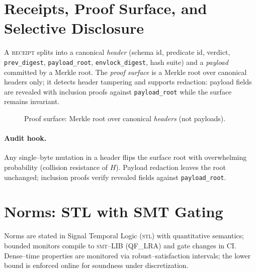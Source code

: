 \documentclass[11pt]{article}
\theoremstyle{plain}
\theoremstyle{remark}
\newcommand{\code}[1]{\texttt{#1}}
\newcommand{\receipt}{\textsc{receipt}}
\newcommand{\stl}{\textsc{stl}}
\newcommand{\smt}{\textsc{smt}}
\begin{document}
\section{Receipts, Proof Surface, and Selective Disclosure}
\label{sec:receipts}
A \receipt{} splits into a canonical \emph{header} (schema id, predicate id, verdict, \code{prev\_digest}, \code{payload\_root}, \code{envlock\_digest}, hash suite) and a \emph{payload} committed by a Merkle root. The \emph{proof surface} is a Merkle root over canonical headers only; it detects header tampering and supports redaction: payload fields are revealed with inclusion proofs against \code{payload\_root} while the surface remains invariant.

\begin{figure}[h]
  \centering
  \caption{Proof surface: Merkle root over canonical \textit{headers} (not payloads).}
  \label{fig:surface}
\end{figure}

\paragraph{Audit hook.}
Any single--byte mutation in a header flips the surface root with overwhelming probability (collision resistance of $H$). Payload redaction leaves the root unchanged; inclusion proofs verify revealed fields against \code{payload\_root}.

\section{Norms: STL with SMT Gating}
\label{sec:norms}
Norms are stated in Signal Temporal Logic (\stl) with quantitative semantics; bounded monitors compile to \smt--LIB (QF\_LRA) and gate changes in CI. Dense--time properties are monitored via robust--satisfaction intervals; the lower bound is enforced online for soundness under discretization.
\end{document}
